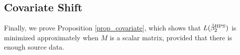  
\iffalse

\subsection{Covariate Shift}\label{app_proof_33}
 
Finally, we prove Proposition \ref{prop_covariate}, which shows that $L(\hat{\beta}_2^{\textup{HPS}})$ is minimized approximately when $M$ is a scalar matrix, provided that there is enough source data.

